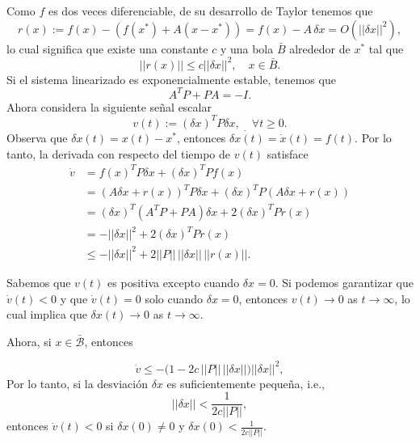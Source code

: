 Como $f$ es dos veces diferenciable, de su desarrollo de Taylor tenemos que
\begin{equation}
	r(x) := f(x) - (f(x^*) + A(x - x^*)) = f(x) - A\,\delta x = O(||\delta x||^2),
\end{equation}
lo cual significa que existe una constante $c$ y una bola $\bar B$ alrededor de $x^*$ tal que 
\begin{equation}
	||r(x)|| \leq c||\delta x||^2, \quad x\in\bar B.
\end{equation}
Si el sistema linearizado es exponencialmente estable, tenemos que
\begin{equation}
A^TP + PA = -I.
\end{equation}
Ahora considera la siguiente señal escalar
\begin{equation}
	v(t) := (\delta x)^T P \delta x, \quad \forall t\geq 0.
\end{equation}
Observa que $\delta x(t) = x(t) - x^*$, entonces $\dot{\delta x(t)} = \dot x(t) = f(t)$. Por lo tanto, la derivada con respecto del tiempo de $v(t)$ satisface
\begin{align}
	\dot v &= f(x)^T P \delta x + (\delta x)^T P f(x) \nonumber \\
	&= (A\delta x + r(x))^T P \delta x + (\delta x)^T P (A\delta x + r(x)) \nonumber \\
	&= (\delta x)^T(A^T P + PA)\delta x + 2(\delta x)^T P r(x) \nonumber \\
	&= -||\delta x||^2 + 2(\delta x)^T P r(x) \nonumber \\
	&\leq -||\delta x||^2 + 2 ||P||\, ||\delta x|| \, ||r(x)||.
\end{align}

Sabemos que $v(t)$ es positiva excepto cuando $\delta x = 0$. Si podemos garantizar que $\dot v(t) < 0$ y que $\dot v(t) = 0$ solo cuando  $\delta x = 0$, entonces $v(t) \to 0$ as $t\to\infty$, lo cual implica que  $\delta x(t) \to 0$ as $t\to\infty$.

Ahora, si $x\in\mathcal{\bar B}$, entonces

\begin{equation}
	\dot v \leq -\Big(1 - 2c\,||P||\,||\delta x||\Big)||\delta x||^2,
\end{equation}
Por lo tanto, si la desviación  $\delta x$ es suficientemente pequeña, i.e., 
\begin{equation}
||\delta x|| < \frac{1}{2c||P||},
\end{equation}
entonces  $\dot v(t) < 0$ si $\delta x(0) \neq 0$ y $\delta x(0) < \frac{1}{2c||P||}$.

